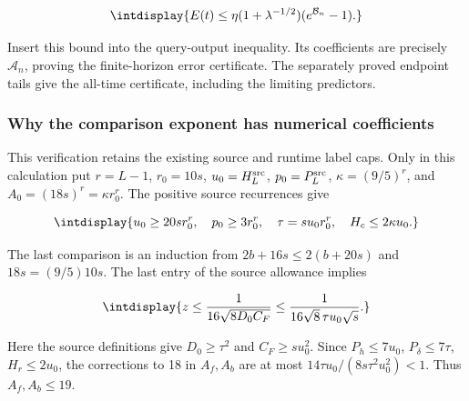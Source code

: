 \begingroup\renewcommand{\theHequation}{intdisplay.606}
\begin{equation}
\intdisplay{
E(t)\le\eta(1+\lambda^{-1/2})(e^{\mathcal B_n}-1).
}
\label{int:eq-0259-harmonic-scalar-comparison-conclusion}
\end{equation}
\endgroup


Insert this bound into the query-output inequality. Its coefficients are precisely \(\mathcal A_n\), proving the finite-horizon error certificate. The separately proved endpoint tails give the all-time certificate, including the limiting predictors.


\subsubsection{Why the comparison exponent has numerical coefficients}
\label{int:compact-full-range-domination-proof}
\label{int:harmonic-full-range-domination-proof}


This verification retains the existing source and runtime label caps. Only in this calculation put \(r=L-1\), \(r_0=10s\), \(u_0=H_L^{\rm src}\), \(p_0=P_L^{\rm src}\), \(\kappa=(9/5)^r\), and \(A_0=(18s)^r=\kappa r_0^r\). The positive source recurrences give


\begingroup\renewcommand{\theHequation}{intdisplay.607}
\begin{equation*}
\intdisplay{
u_0\ge20sr_0^r,\quad p_0\ge3r_0^r,\quad
\tau=su_0r_0^r,\quad H_c\le2\kappa u_0.
}
\end{equation*}
\endgroup


The last comparison is an induction from \(2b+16s\le2(b+20s)\) and \(18s=(9/5)10s\). The last entry of the source allowance implies


\begingroup\renewcommand{\theHequation}{intdisplay.608}
\begin{equation}
\intdisplay{
z\le\frac1{16\sqrt{8D_0C_F}}
  \le\frac1{16\sqrt8\,\tau u_0\sqrt s}.
}
\label{int:eq-0260-harmonic-source-smallness-consequence}
\end{equation}
\endgroup


Here the source definitions give \(D_0\ge\tau^2\) and \(C_F\ge su_0^2\). Since \(P_h\le7u_0\), \(P_\delta\le7\tau\), \(H_r\le2u_0\), the corrections to 18 in \(A_f,\allowbreak A_b\) are at most \(14\tau u_0/(8s\tau^2u_0^2)<1\). Thus \(A_f,\allowbreak A_b\le19\).


